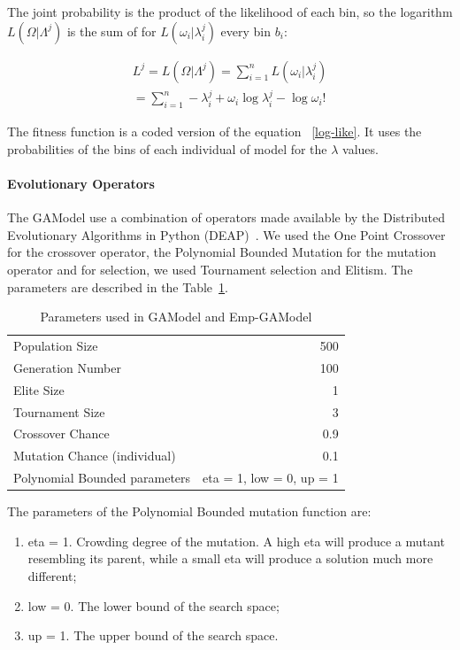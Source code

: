 The joint probability is the product of the likelihood of each bin, so
the logarithm $L(\Omega|\Lambda^j)$ is the sum of for
$L(\omega_i|\lambda_i^j)$ every bin $b_i$:

\begin{equation}\label{log-like}
\begin{split}
	L^j = L(\Omega|\Lambda^j) = \sum_{i=1}^{n}L(\omega_i|\lambda_i^j)  \\
	= \sum_{i=1}^{n} -\lambda_i^j + \omega_i\log\lambda_i^j - \log\omega_i!  
\end{split}
\end{equation}

The fitness function is a coded version of the equation
~\ref{log-like}. It uses the probabilities of the bins of each
individual of model for the $\lambda$ values.

\paragraph{Evolutionary Operators}\label{gaOperators}
The GAModel use a combination of operators made available by the Distributed Evolutionary Algorithms in Python (DEAP)~\cite{DeRainville}. We used the One Point Crossover for the crossover operator, the Polynomial Bounded Mutation for the mutation operator and for selection, we used Tournament selection and Elitism. The parameters are described in the Table~\ref{GAParameters5.1}.

\begin{table}[H]
  \caption{Parameters used in GAModel and Emp-GAModel}
  \label{GAParameters5.1}
  \begin{center}
  \begin{tabular}{|l|r|}
    \hline
    Population Size & 500\\
    Generation Number & 100\\
    Elite Size & 1\\
    Tournament Size & 3\\
    Crossover Chance & 0.9\\
    Mutation Chance (individual) & 0.1\\
	Polynomial Bounded parameters & eta = 1, low = 0, up = 1\\
    \hline    
  \end{tabular}
  \end{center}
\end{table}

The parameters of the Polynomial Bounded mutation function are: 
\begin{enumerate}
\item eta = 1. Crowding degree of the mutation. A high eta will produce a mutant resembling its parent, while a small eta will produce a solution much more different;
\item low = 0. The lower bound of the search space;
\item up = 1. The upper bound of the search space.
\end{enumerate}


